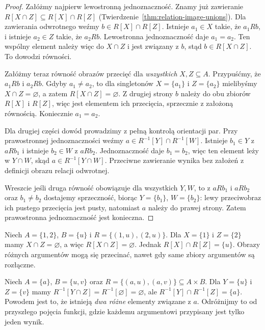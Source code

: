 \begin{proof}
Załóżmy najpierw lewostronną jednoznaczność. Znamy już
zawieranie $R[X\cap Z]\subseteq R[X]\cap R[Z]$
(Twierdzenie~\ref{thm:relation-image-unions}).
Dla zawierania odwrotnego weźmy $b\in R[X]\cap R[Z]$.
Istnieje $a_1\in X$ takie, że $a_1Rb$, i istnieje
$a_2\in Z$ takie, że $a_2Rb$. Lewostronna jednoznaczność
daje $a_1=a_2$. Ten wspólny element należy więc do
$X\cap Z$ i jest związany z $b$, stąd $b\in R[X\cap Z]$.
To dowodzi równości.

Załóżmy teraz równość obrazów przecięć dla \emph{wszystkich}
$X,Z\subseteq A$. Przypuśćmy, że $a_1Rb$ i $a_2Rb$.
Gdyby $a_1\ne a_2$, to dla singletonów
$X=\{a_1\}$ i $Z=\{a_2\}$ mielibyśmy
$X\cap Z=\varnothing$, a zatem $R[X\cap Z]=\varnothing$.
Z drugiej strony $b$ należy do obu zbiorów $R[X]$
i $R[Z]$, więc jest elementem ich przecięcia,
sprzecznie z założoną równością. Koniecznie $a_1=a_2$.

Dla drugiej części dowód prowadzimy z pełną kontrolą
orientacji par. Przy prawostronnej jednoznaczności
weźmy $a\in R^{-1}[Y]\cap R^{-1}[W]$.
Istnieje $b_1\in Y$ z $aRb_1$ i istnieje $b_2\in W$
z $aRb_2$. Jednoznaczność daje $b_1=b_2$,
więc ten element leży w $Y\cap W$, skąd
$a\in R^{-1}[Y\cap W]$. Przeciwne zawieranie
wynika bez założeń z definicji obrazu relacji odwrotnej.

Wreszcie jeśli druga równość obowiązuje dla wszystkich
$Y,W$, to z $aRb_1$ i $aRb_2$ oraz $b_1\ne b_2$
dostajemy sprzeczność, biorąc $Y=\{b_1\}$,
$W=\{b_2\}$: lewy przeciwobraz ich pustego przecięcia
jest pusty, natomiast $a$ należy do prawej strony.
Zatem prawostronna jednoznaczność jest konieczna.
\end{proof}


\begin{przyklad}
Niech $A=\{1,2\}$, $B=\{u\}$ i
$R=\{(1,u),(2,u)\}$. Dla $X=\{1\}$ i $Z=\{2\}$
mamy $X\cap Z=\varnothing$, a więc
$R[X\cap Z]=\varnothing$. Jednak
$R[X]\cap R[Z]=\{u\}$.
Obrazy różnych argumentów mogą się przecinać, nawet gdy
same zbiory argumentów są rozłączne.
\end{przyklad}

\begin{przyklad}
Niech $A=\{a\}$, $B=\{u,v\}$ oraz
$R=\{(a,u),(a,v)\}\subseteq A\times B$.
Dla $Y=\{u\}$ i $Z=\{v\}$ mamy
$R^{-1}[Y\cap Z]=R^{-1}[\varnothing]=\varnothing$, ale
$R^{-1}[Y]\cap R^{-1}[Z]=\{a\}$.
Powodem jest to, że istnieją \emph{dwa różne} elementy
związane z $a$. Odróżnijmy to od przyszłego pojęcia funkcji,
gdzie każdemu argumentowi przypisany jest tylko jeden wynik.
\end{przyklad}


